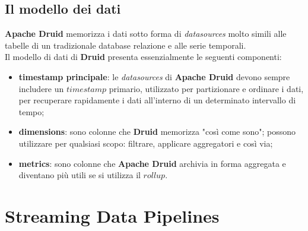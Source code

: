 \subsection{Il modello dei dati}
\textbf{Apache Druid} memorizza i dati sotto forma di \textit{datasources} molto simili alle tabelle di un tradizionale database relazione e alle serie temporali.
\\Il modello di dati di \textbf{Druid} presenta essenzialmente le seguenti componenti:
\begin{itemize}
    \item \textbf{timestamp principale}:  le \textit{datasources} di \textbf{Apache Druid}  devono sempre includere un $timestamp$ primario,  utilizzato per partizionare e ordinare i dati, per recuperare rapidamente i dati all'interno di un determinato intervallo di tempo;
    \item \textbf{dimensions}: sono colonne che \textbf{Druid} memorizza "così come sono"; possono utilizzare per qualsiasi scopo: filtrare, applicare aggregatori e così via;
    \item \textbf{metrics}: sono colonne che \textbf{Apache Druid} archivia in forma aggregata e diventano più utili se si utilizza il $rollup$.
\end{itemize}
\pagebreak
\section{Streaming Data Pipelines}
